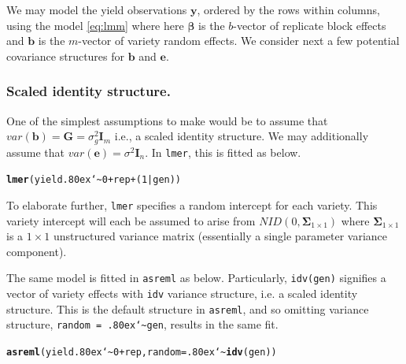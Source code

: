 \documentclass[runningheads]{llncs}\usepackage[]{graphicx}\usepackage[]{color}
\makeatletter
\newcommand{\hlnum}[1]{\textcolor[rgb]{0.686,0.059,0.569}{#1}}%
\newcommand{\hlopt}[1]{\textcolor[rgb]{0,0,0}{#1}}%
\newcommand{\hlstd}[1]{\textcolor[rgb]{0.345,0.345,0.345}{#1}}%
\newcommand{\hlkwc}[1]{\textcolor[rgb]{0.333,0.667,0.333}{#1}}%
\newcommand{\hlkwd}[1]{\textcolor[rgb]{0.737,0.353,0.396}{\textbf{#1}}}%
\newenvironment{kframe}{%
 \def\at@end@of@kframe{}%
 \ifinner\ifhmode%
  \def\at@end@of@kframe{\end{minipage}}%
  \begin{minipage}{\columnwidth}%
 \fi\fi%
 \def\FrameCommand##1{\hskip\@totalleftmargin \hskip-\fboxsep
 \colorbox{shadecolor}{##1}\hskip-\fboxsep
     \hskip-\linewidth \hskip-\@totalleftmargin \hskip\columnwidth}%
 \MakeFramed {\advance\hsize-\width
   \@totalleftmargin\z@ \linewidth\hsize
   \@setminipage}}%
 {\par\unskip\endMakeFramed%
 \at@end@of@kframe}
\newenvironment{knitrout}{}{} %
\newcommand{\mytilde}{\lower.80ex\hbox{\char`\~}}
\makeatother
\begin{document}
We may model the yield observations $\boldsymbol{y}$, ordered by the rows within columns, using the model \eqref{eq:lmm} where here $\boldsymbol{\beta}$ is the $b$-vector of replicate block effects and $\boldsymbol{b}$ is the $m$-vector of variety random effects. We consider next a few potential covariance structures for $\boldsymbol{b}$ and $\boldsymbol{e}$.


\subsubsection{Scaled identity structure.}

One of the simplest assumptions to make would be to assume that $var(\boldsymbol{b}) = \mathbf{G} = \sigma_g^2 \mathbf{I}_m$ i.e., a scaled identity structure. We may additionally assume that $var(\boldsymbol{e}) = \sigma^2\mathbf{I}_n$. In \texttt{lmer}, this is fitted as below. 

\begin{knitrout}
	\color{fgcolor}\begin{kframe}
		\begin{alltt}
			\hlkwd{lmer}\hlstd{(yield} \hlopt{\mytilde} \hlnum{0} \hlopt{+} \hlstd{rep} \hlopt{+} \hlstd{(}\hlnum{1} \hlopt{|} \hlstd{gen))}
		\end{alltt}
	\end{kframe}
\end{knitrout}

To elaborate further, \texttt{lmer} specifies a random intercept for each variety. This variety intercept will each be assumed to arise from $NID(0, \mathbf{\Sigma}_{1\times 1})$ where $\mathbf{\Sigma}_{1\times 1}$ is a $1\times 1$ unstructured variance matrix (essentially a single parameter variance component).

The same model is fitted in \texttt{asreml} as below. Particularly, \texttt{idv(gen)} signifies a vector of variety effects with \texttt{idv} variance structure, i.e. a scaled identity structure. This is the default structure in \texttt{asreml}, and so omitting variance structure, \texttt{random = \mytilde gen}, results in the same fit.

\begin{knitrout}
	\color{fgcolor}\begin{kframe}
		\begin{alltt}
			\hlkwd{asreml}\hlstd{(yield} \hlopt{\mytilde} \hlnum{0} \hlopt{+} \hlstd{rep,} \hlkwc{random} \hlstd{=} \hlopt{\mytilde}\hlkwd{idv}\hlstd{(gen))}
		\end{alltt}
	\end{kframe}
\end{knitrout}
\end{document}
